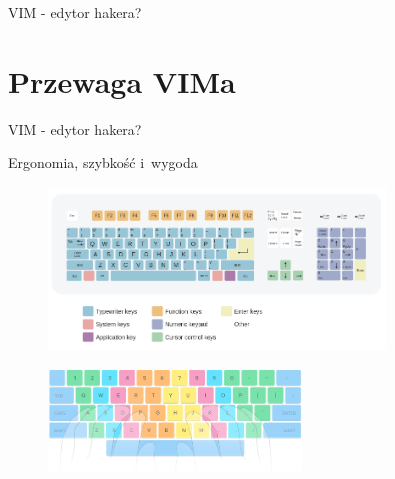 \documentclass{beamer}
\begin{document}
\begin{frame}[t]{VIM - edytor hakera?}
\end{frame}

\section{Przewaga VIMa}
\label{sec:Przewaga VIMa}

\begin{frame}[t]{VIM - edytor hakera?}
\end{frame}

\begin{frame}[t]{Ergonomia, szybkość i~wygoda}
\begin{figure}
\centering
\vspace{-15pt}
\includegraphics[width=0.8\textwidth]{images/full_keyboard}
\end{figure}
\begin{figure}
\centering
\vspace{-10pt}
\includegraphics[width=0.6\textwidth]{images/edu_keyboard}
\end{figure}
\end{frame}
\end{document}
